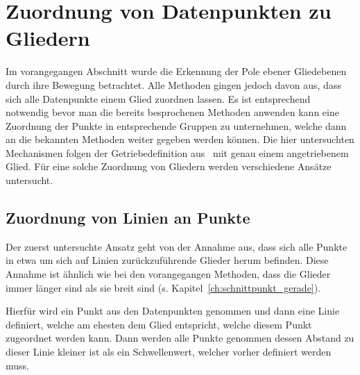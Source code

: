 
\chapter{Zuordnung von Datenpunkten zu Gliedern} \label{ch:gruppierung_von_datenpunkten}


Im vorangegangen Abschnitt wurde die Erkennung der Pole ebener Gliedebenen durch ihre Bewegung betrachtet.
Alle Methoden gingen jedoch davon aus, dass sich alle Datenpunkte einem Glied zuordnen lassen.
Es ist entsprechend notwendig bevor man die bereits besprochenen Methoden anwenden kann eine Zuordnung der Punkte in entsprechende Gruppen zu unternehmen, welche dann an die bekannten Methoden weiter gegeben werden können.
Die hier untersuchten Mechanismen folgen der Getriebedefinition aus~\cite[G167]{Grote2014} mit genau einem angetriebenem Glied.
Für eine solche Zuordnung von Gliedern werden verschiedene Ansätze untersucht.

\section{Zuordnung von Linien an Punkte}\label{ch:naive_grouping_approach}

Der zuerst untersuchte Ansatz geht von der Annahme aus, dass sich alle Punkte in etwa um sich auf Linien zurückzuführende Glieder herum befinden.
Diese Annahme ist ähnlich wie bei den vorangegangen Methoden, dass die Glieder immer länger sind als sie breit sind (s. Kapitel~\ref{ch:schnittpunkt_gerade}).

Hierfür wird ein Punkt aus den Datenpunkten genommen und dann eine Linie definiert, welche am ehesten dem Glied entspricht, welche diesem Punkt zugeordnet werden kann.
Dann werden alle Punkte genommen dessen Abstand zu dieser Linie kleiner ist als ein Schwellenwert, welcher vorher definiert werden muss.

